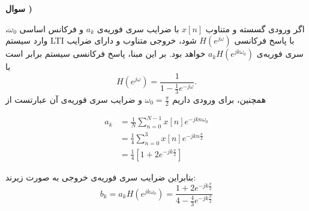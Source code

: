 \documentclass{article}
\newcounter{qnumber}
\newcommand{\Q}{
\textbf{سوال \theqnumber)}
\stepcounter{qnumber}
}
\newcommand{\qn}[1]{
\[
\begin{split}
#1
\end{split}
\]
}
\begin{document}
\Q

اگر ورودی گسسته‌ و متناوب
$
x[n]
$
با ضرایب سری فوریه‌ی 
$
a_k
$
و فرکانس اساسی $\omega_0$، وارد سیستم LTI با پاسخ فرکانسی
$
H(e^{j\omega})
$
شود، خروجی متناوب و دارای ضرایب سری فوریه‌ی 
$
a_kH(e^{jk\omega_0})
$
خواهد بود. بر این مبنا، پاسخ فرکانسی سیستم برابر است با
$$
H(e^{j\omega})=\frac{1}{1-\frac{1}{3}e^{-j\omega}}.
$$
همچنین، برای ورودی داریم
$
\omega_0=\frac{\pi}{2}
$
و ضرایب سری فوریه‌ی آن عبارتست از
\qn{
a_k&=\frac{1}{N}\sum_{n=0}^{N-1}x[n]e^{-jkn\omega_0}
\\&=\frac{1}{4}\sum_{n=0}^{3}x[n]e^{-jkn\frac{\pi}{2}}
\\&=\frac{1}{4}\left[1+2e^{-jk\frac{\pi}{2}}\right]
}
بنابراین ضرایب سری فوریه‌ی خروجی به صورت زیرند:
$$
b_k=a_kH(e^{jk\omega_0})=
\frac{1+2e^{-jk\frac{\pi}{2}}}{4-\frac{4}{3}e^{-jk\frac{\pi}{2}}}
$$
\end{document}
